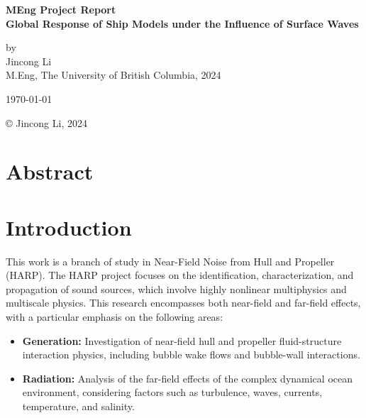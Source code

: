\documentclass[12pt]{article} %
\begin{document}
\setlength{\parskip}{1em} 
\setlength{\parindent}{0pt}
\newcommand{\vect}[1]{\mathbf{#1}}

\begin{titlepage}  %
    \centering    %

    \vspace*{2cm}
    
    \normalsize \textbf{MEng Project Report} \\
    \vspace{0.5cm}  %
    \normalsize\textbf{Global Response of Ship Models under the Influence of Surface Waves} \\
    \vspace{2cm}  %
    
    \normalsize by\\
    \vspace{1cm}
    \normalsize Jincong Li \\ 
    \vspace{1cm}
    \normalsize M.Eng, The University of British Columbia, 2024
    \vspace{11cm}  %
    
    \normalsize \today

    \vfill  %
    © Jincong Li, 2024
\end{titlepage}
\tableofcontents
\newpage
\section{Abstract}

\section{Introduction}
This work is a branch of study in Near-Field Noise from Hull and Propeller (HARP). 
The HARP project focuses on the identification, characterization, and propagation of sound sources, 
which involve highly nonlinear multiphysics and multiscale physics. This research encompasses both 
near-field and far-field effects, with a particular emphasis on the following areas:

\begin{itemize}
    \item \textbf{Generation:} Investigation of near-field hull and propeller fluid-structure 
    interaction physics, including bubble wake flows and bubble-wall interactions.
    \item \textbf{Radiation:} Analysis of the far-field effects of the complex dynamical ocean 
    environment, considering factors such as turbulence, waves, currents, temperature, and salinity.
\end{itemize}
\end{document}
